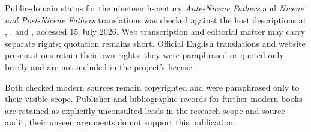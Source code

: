 Public-domain status for the nineteenth-century \emph{Ante-Nicene Fathers}
and \emph{Nicene and Post-Nicene Fathers} translations was checked against
the host descriptions at
,
,
and ,
accessed 15 July 2026. Web transcription and editorial matter may carry
separate rights; quotation remains short. Official English translations and
website presentations retain their own rights; they were paraphrased or quoted
only briefly and are not included in the project's license.

Both checked modern sources remain copyrighted and were paraphrased only to
their visible scope. Publisher and bibliographic records for further modern
books are retained as explicitly unconsulted leads in the research scope and
source audit; their unseen arguments do not support this publication.
